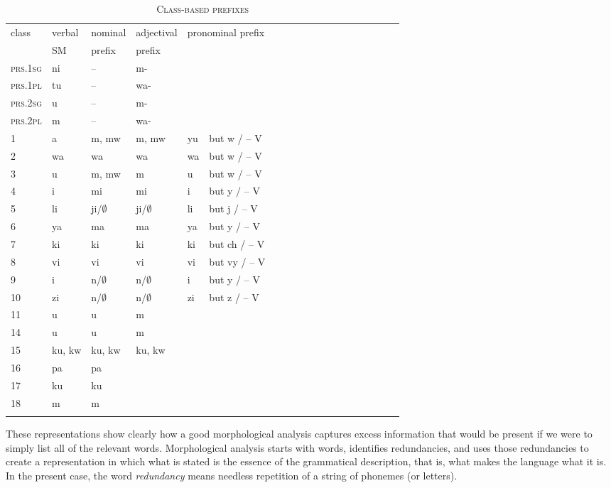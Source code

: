 \documentclass[output=paper,colorlinks,citecolor=brown]{langscibook}
\begin{document}
\begin{table}
\begin{tabular}{lllllllllllllllllll}\lsptoprule
class & verbal & nominal & adjectival   & \multicolumn{2}{l}{pronominal prefix} \\
&SM & prefix & prefix\\ \midrule
\textsc{prs.1sg} & ni &  --  & m- \\
\textsc{prs.1pl} & tu & --  & wa- \\
\textsc{prs.2sg} & u & --  &m-  \\
\textsc{prs.2pl} & m & -- & wa- \\
1 & a & m, mw  & m, mw & yu & but w / -- V \\
2 & wa & wa & wa & wa & but w / -- V\\
3 & u & m, mw & m & u&  but w / -- V \\
4 & i & mi & mi & i& but y / -- V  \\
5 & li & ji/$\emptyset$ & ji/$\emptyset$ & li & but j / -- V  \\
6 & ya & ma & ma & ya & but y / -- V  \\
7 & ki &ki & ki & ki & but ch / -- V \\
8 & vi & vi & vi & vi & but vy / -- V  \\
9 & i & n/$\emptyset$ & n/$\emptyset$  & i & but y / -- V  \\
10 & zi & n/$\emptyset$ & n/$\emptyset$  & zi & but z / -- V    \\
11 & u & u  & m  \\
14 & u & u & m \\
15 & ku, kw & ku, kw  & ku, kw\\ 
16 & pa & pa\\
17 & ku & ku \\
18 & m & m \\
\lspbottomrule
\end{tabular}
\caption{\textsc{Class-based prefixes}}
\label{class-based-system}
\end{table}
 
  
These representations show clearly how a good morphological analysis captures excess information that would be present if we were to simply list all of the relevant words. Morphological analysis starts with words, identifies redundancies, and uses those redundancies to create a representation in which what is stated is the essence of the grammatical description, that is, what makes the language what it is. In the present case, the word \textit{redundancy} means needless repetition of a string of phonemes (or letters).
\end{document}
